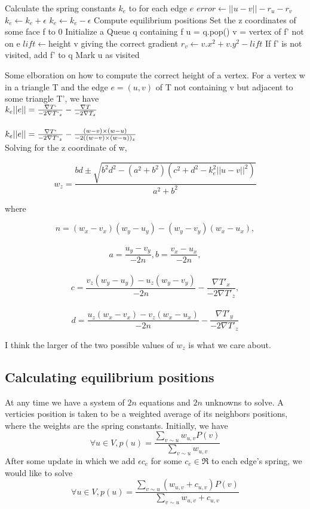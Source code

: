 \documentclass{article}
\begin{document}
\begin{algorithmic}
\State Calculate the spring constants $k_e$ to for each edge $e$
				\State $error\gets ||u-v|| - r_u - r_v$
						\State $k_e\gets k_e + \epsilon$
						\State $k_e\gets k_e - \epsilon$
				\EndIf
		\EndFor
		\State Compute equilibrium positions
		\State Set the z coordinates of some face f to 0
		\State Initialize a Queue q containing f
				\State u = q.pop()
						\State v = vertex of f' not on e
						\State $lift\gets $height v giving the correct gradient
						\State $r_v\gets v.x^2 + v.y^2 - lift$
						\State If f' is not visited, add f' to q
				\EndFor
				\State Mark u as visited
		\EndWhile
\EndWhile
\end{algorithmic}	

Some elboration on how to compute the correct height of a vertex. For a vertex w in a triangle T and the edge $e = (u,v)$ of T not containing v but adjacent to some triangle T', we have
\\$k_e||e|| = \frac{\nabla T`}{-2\nabla T`_z} - \frac{\nabla T}{-2\nabla T_z}$\\
\\$k_e||e|| = \frac{\nabla T`}{-2\nabla T`_z} - \frac{(w-v)\times(w-u)}{-2((w-v)\times(w-u) )_z}$\\

Solving for the z coordinate of w,

$$w_z = \frac{bd \pm \sqrt{b^2d^2-(a^2+b^2)(c^2+d^2-k_e^2||u-v||^2)}}{a^2 + b^2}$$

where

$$n = (w_x - v_x)(w_y-u_y) - (w_y-v_y)(w_x-u_x),$$\\
$$a=\frac{u_y - v_y}{-2n}, b = \frac{v_x-u_x}{-2n},$$\\ 
$$c = \frac{v_z(w_y-u_y) - u_z(w_y-v_y)}{-2n} - \frac{\nabla T'_x}{-2\nabla T'_z},$$ \\
$$d = \frac{u_z(w_x-v_x) - v_z(w_x-u_x)}{-2n} - \frac{\nabla T'_y}{-2\nabla T'_z}$$

I think the larger of the two possible values of $w_z$ is what we care about. 

\subsection{Calculating equilibrium positions}

At any time we have a system of $2n$ equations and $2n$ unknowns to solve. A verticies position is taken to be a weighted average of its neighbors positions, where the weights are the spring constants. Initially, we have
$$ \forall u \in V, p(u) = \frac{\sum\limits_{v \sim u}{w_{u,v}P(v)}}{\sum\limits_{v \sim u}{w_{u,v}}}$$
After some update in which we add $\epsilon c_e$ for some $c_e \in \Re $ to each edge's spring, we would like to solve
$$ \forall u \in V, p(u) = \frac{\sum\limits_{v \sim u}{(w_{u,v}+c_{u,v})P(v)}}{\sum\limits_{v \sim u}{w_{u,v}+c_{u,v}}}$$
\end{document}
